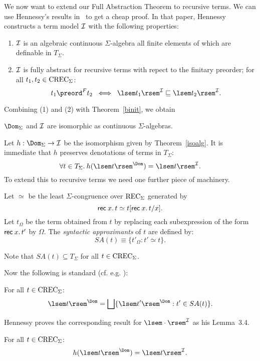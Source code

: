 We now want to extend our Full Abstraction Theorem to recursive terms.
We can use Hennessy's results in~\cite{Hen81} to get a cheap proof.
In that paper, Hennessy constructs a term model $\cal I$ with the following properties:
\begin{enumerate}
\item $\cal I$ is an algebraic continuous $\Sigma$-algebra all finite elements of which are definable in $T_{\Sigma}$.
\item $\cal I$ is fully abstract for recursive terms with repect to the finitary preorder; for all $t_{1}, t_{2} \in {\rm CREC}_{\Sigma}$:
\[ t_{1} \preord^{F} t_{2} \;\; \Longleftrightarrow \;\; \lsem t_{1} \rsem^{\cal I} \sqsubseteq  \lsem t_{2} \rsem^{\cal I}. \]
\end{enumerate}
Combining (1) and (2) with Theorem~\ref{binit}, we obtain
\begin{theorem}
\label{isoalg}
$\Dom_{\Sigma}$ and $\cal I$ are isomorphic as continuous $\Sigma$-algebras.
\end{theorem}
Let $h : \Dom_{\Sigma} \rightarrow {\cal I}$ be the isomorphism given by Theorem~\ref{isoalg}.
It is immediate that $h$ preserves denotations of terms in $T_{\Sigma}$:
\[ \forall t \in T_{\Sigma}. \: h(\lsem t \rsem^{\Dom}) = \lsem t \rsem^{\cal I} . \]
To extend this to recursive terms we need one further piece of machinery.
\begin{definition}
{\rm Let $\simeq$ be the least $\Sigma$-congruence over ${\rm REC}_{\Sigma}$ generated by
\[ {\sf rec} \: x. \, t \simeq t[{\sf rec} \: x. \, t/x] . \]
Let $t_{\Omega}$ be the term obtained from $t$ by replacing each subexpression of the form ${\sf rec} \: x. \, t'$ by $\Omega$.
The {\em syntactic approximants} of $t$ are defined by:
\[ SA(t) \equiv \{ t'_{\Omega} : t' \simeq t \} . \] } 
\end{definition}
Note that $SA(t) \subseteq T_{\Sigma}$ for all $t \in {\rm CREC}_{\Sigma}$.

Now the following is standard (cf. e.g. \cite{ADJ77}):
\begin{lemma}
\label{sapprox}
For all $t \in {\rm CREC}_{\Sigma}$:
\[ \lsem t \rsem^{\Dom} = \bigsqcup \{ \lsem t' \rsem^{\Dom} : t' \in SA(t) \} . \]
\end{lemma}
Hennessy proves the corresponding result for $\lsem \cdot \rsem^{\cal I}$ as his Lemma~3.4.

\begin{proposition}
\label{hpres}
For all $t \in {\rm CREC}_{\Sigma}$:
\[ h(\lsem t \rsem^{\Dom}) = \lsem t \rsem^{\cal I} . \]
\end{proposition}

